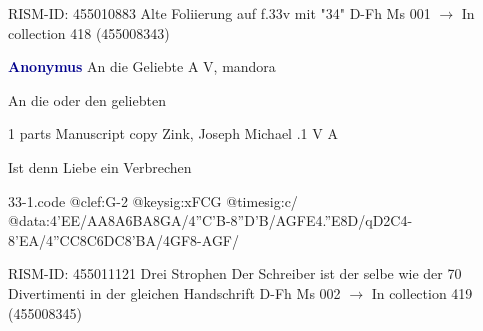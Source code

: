 \documentclass[twocolumn]{book}
\begin{document}
\newline RISM-ID: 455010883
\newline Alte Foliierung auf f.33v mit "34"
\newline D-Fh  Ms 001
\newline $\rightarrow$ In collection 418 (455008343)

\newline \par \vspace{7pt} \textcolor{darkblue}{\textbf{Anonymus  }}
\newline An die Geliebte  A  
\newline V, mandora
\newline \begin{itshape}[heading, f.45v:] An die oder den geliebten\end{itshape} 
\newline \textcolor{darkblue}{}  1 parts  
\newline Manuscript copy
\newline Zink, Joseph Michael
.1  V  A
\newline \begin{footnotesize} Ist denn Liebe ein Verbrechen \end{footnotesize}  
\begin{filecontents*}{33-1.code}
@clef:G-2
@keysig:xFCG
@timesig:c/
@data:4'EE/AA{8A6BA}8GA/4''C'B-8''D'B/{AG}{FE}4.''E8D/qD2C4-8'EA/4''CC{8C6DC}8'BA/4GF8-AGF/
\end{filecontents*}
\newline
%

\newline RISM-ID: 455011121
\newline Drei Strophen
\newline Der Schreiber ist der selbe wie der 70 Divertimenti in der gleichen Handschrift
\newline D-Fh  Ms 002
\newline $\rightarrow$ In collection 419 (455008345)
\end{document}
